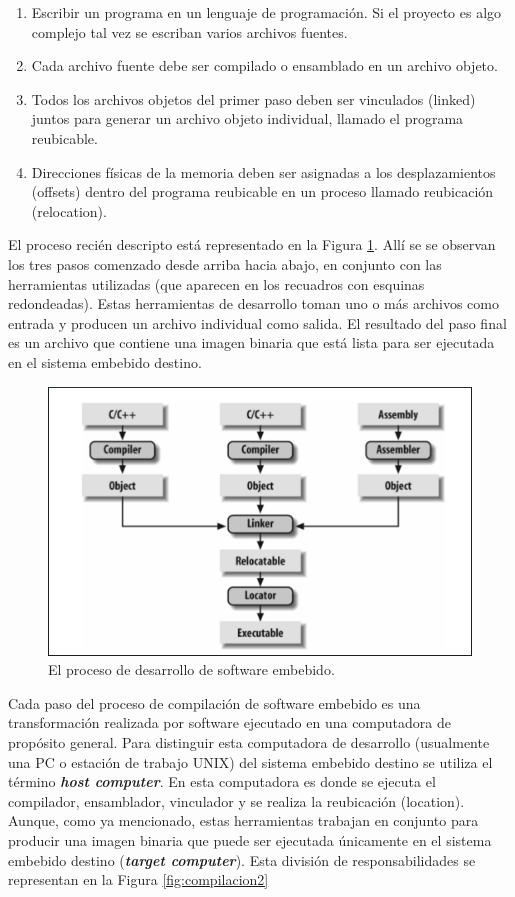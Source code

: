 \documentclass[output=paper, 
colorlinks,
citecolor=brown,
newtxmath
]{langscibook}
\begin{document}
\begin{enumerate}
\item Escribir un programa en un lenguaje de programación. Si el proyecto
es algo complejo tal vez se escriban varios archivos fuentes.
\item Cada archivo fuente debe ser compilado o ensamblado en un archivo objeto.
\item Todos los archivos objetos del primer paso deben ser vinculados (linked)
juntos para generar un archivo objeto individual, llamado el programa reubicable.
\item Direcciones físicas de la memoria deben ser asignadas a los desplazamientos (offsets)
dentro del programa reubicable en un proceso llamado reubicación (relocation).
\end{enumerate}


El proceso recién descripto está representado en la Figura \ref{fig:compilacion}.
Allí se se observan los tres pasos comenzado desde arriba hacia abajo,
en conjunto con las herramientas utilizadas (que aparecen
en los recuadros con esquinas redondeadas).
Estas herramientas de desarrollo toman uno o más archivos como entrada
y producen un archivo individual como salida. 
El resultado del paso final es un archivo que contiene una imagen binaria
que está lista para ser ejecutada en el sistema embebido destino.

\begin{figure}
\includegraphics[width=\linewidth]{images/ciclo_de_compilacion.png}
\caption{El proceso de desarrollo de software embebido.}
\label{fig:compilacion}
\end{figure}



Cada paso del proceso de compilación de software embebido
es una transformación realizada por software ejecutado en una computadora
de propósito general. Para distinguir esta computadora de desarrollo (usualmente una 
PC o estación de trabajo UNIX) del sistema embebido destino se utiliza el término \textit{\textbf{host computer}}.
En esta computadora es donde se ejecuta el compilador, ensamblador, vinculador y se realiza la reubicación (location).
Aunque, como ya mencionado, estas herramientas trabajan en conjunto
para producir una imagen binaria que puede ser ejecutada
únicamente en el sistema embebido destino (\textit{\textbf{target
computer}}). Esta división de responsabilidades
se representan en la Figura \ref{fig:compilacion2}
\end{document}
